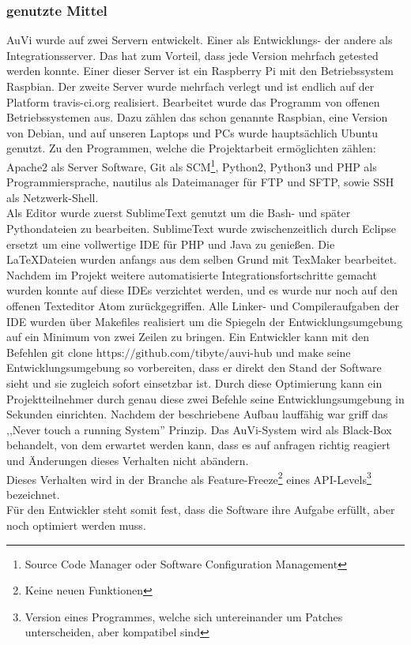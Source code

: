 \subsubsection{genutzte Mittel} %
AuVi wurde auf zwei Servern entwickelt. Einer als Entwicklungs- der andere als Integrationsserver.
Das hat zum Vorteil, dass jede Version mehrfach getested werden konnte.
Einer dieser Server ist ein Raspberry Pi mit den Betriebssystem Raspbian.
Der zweite Server wurde mehrfach verlegt und ist endlich auf der Platform travis-ci.org realisiert.
Bearbeitet wurde das Programm von offenen Betriebssystemen aus. Dazu zählen das schon genannte
Raspbian, eine Version von Debian, und auf unseren Laptops und PCs wurde hauptsächlich Ubuntu genutzt.
Zu den Programmen, welche die Projektarbeit ermöglichten zählen: Apache2 als Server
Software, Git als SCM\footnote{Source Code Manager oder Software Configuration Management},
Python2, Python3 und PHP als Programmiersprache, nautilus als Dateimanager für FTP und SFTP, sowie
SSH als Netzwerk-Shell.\\
Als Editor wurde zuerst SublimeText genutzt um die Bash- und später Pythondateien zu bearbeiten.
SublimeText wurde zwischenzeitlich durch Eclipse ersetzt um eine vollwertige IDE für PHP und Java zu
genießen. Die \LaTeX Dateien wurden anfangs aus dem selben Grund mit TexMaker bearbeitet.
Nachdem im Projekt weitere automatisierte Integrationsfortschritte gemacht wurden konnte auf
diese IDEs verzichtet werden, und es wurde nur noch auf den offenen Texteditor Atom zurückgegriffen.
Alle Linker- und Compileraufgaben der IDE wurden über Makefiles realisiert um die Spiegeln der
Entwicklungsumgebung auf ein Minimum von zwei Zeilen zu bringen. Ein Entwickler kann mit den
Befehlen $\text{git clone https://github.com/tibyte/auvi-hub}$ und $\text{make}$ seine Entwicklungsumgebung
so vorbereiten, dass er direkt den Stand der Software sieht und sie zugleich sofort einsetzbar ist.
Durch diese Optimierung kann ein Projektteilnehmer durch genau diese zwei Befehle seine Entwicklungsumgebung
in Sekunden einrichten.
Nachdem der beschriebene Aufbau lauffähig war griff das ,,Never touch a running System'' Prinzip.
Das AuVi-System wird als Black-Box behandelt, von dem erwartet werden kann, dass es auf anfragen
richtig reagiert und Änderungen dieses Verhalten nicht abändern.\\
Dieses Verhalten wird in der Branche als Feature-Freeze\footnote{Keine neuen Funktionen}
eines API-Levels\footnote{Version eines Programmes, welche sich untereinander um Patches unterscheiden,
aber kompatibel sind} \cite{semver} bezeichnet.\\
Für den Entwickler steht somit fest, dass die Software ihre Aufgabe erfüllt, aber noch optimiert
werden muss.


